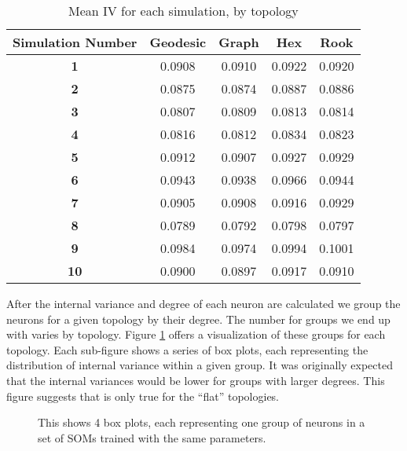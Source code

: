 \begin{table}[hbt]
\centering
\caption{Mean IV for each simulation, by topology}
\label{ivtable3}
\begin{tabular}{|c||c|c|c|c|}
\hline
\textbf{Simulation Number} & Geodesic & Graph & Hex & Rook \\
\hline
\hline
\textbf{1} & 0.0908 & 0.0910 & 0.0922 & 0.0920 \\
\hline
\textbf{2} & 0.0875 & 0.0874 & 0.0887 & 0.0886 \\
\hline
\textbf{3} & 0.0807 & 0.0809 & 0.0813 & 0.0814 \\
\hline
\textbf{4} & 0.0816 & 0.0812 & 0.0834 & 0.0823 \\
\hline
\textbf{5} & 0.0912 & 0.0907 & 0.0927 & 0.0929 \\
\hline
\textbf{6} & 0.0943 & 0.0938 & 0.0966 & 0.0944 \\
\hline
\textbf{7} & 0.0905 & 0.0908 & 0.0916 & 0.0929 \\
\hline
\textbf{8} & 0.0789 & 0.0792 & 0.0798 & 0.0797 \\
\hline
\textbf{9} & 0.0984 & 0.0974 & 0.0994 & 0.1001 \\
\hline
\textbf{10} & 0.0900 & 0.0897 & 0.0917 & 0.0910 \\
\hline
\end{tabular} \end{table}

After the internal variance and degree of each neuron are calculated we
group the neurons for a given topology by their degree. The number for groups
we end up with varies by topology. Figure \ref{boxplot} offers a visualization
of these groups for each topology.  Each sub-figure shows a series of box
plots, each representing the distribution of internal variance within a given
group.  It was originally expected that the internal variances would be lower
for groups with larger degrees. This figure suggests that is only true for the
``flat'' topologies.

\begin{figure}[hbt]
\label{boxplot}
\centering
{}
\caption{This shows 4 box plots, each representing one group of neurons in a set
of SOMs trained with the same parameters.}
\end{figure}

